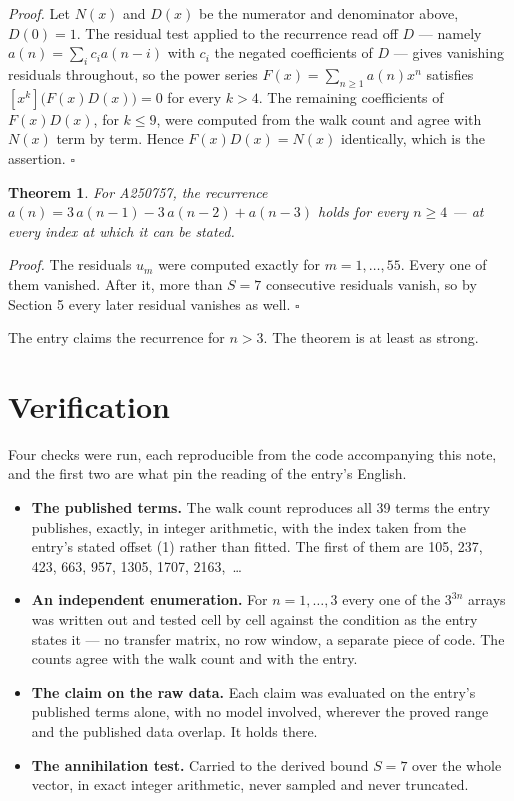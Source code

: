 \documentclass[11pt]{article}
\newtheorem{theorem}{Theorem}
\theoremstyle{definition}
\begin{document}
{\itshape Proof.} Let $N(x)$ and $D(x)$ be the numerator and denominator above, $D(0)=1$. The residual test applied to the recurrence read off $D$ --- namely $a(n) = \sum_i c_i a(n-i)$ with $c_i$ the negated coefficients of $D$ --- gives vanishing residuals throughout, so the power series $F(x)=\sum_{n\ge 1}a(n)x^n$ satisfies $[x^k]\bigl(F(x)D(x)\bigr) = 0$ for every $k > 4$. The remaining coefficients of $F(x)D(x)$, for $k \le 9$, were computed from the walk count and agree with $N(x)$ term by term. Hence $F(x)D(x) = N(x)$ identically, which is the assertion. $\square$

\begin{theorem} For A250757, the recurrence $a(n) = 3\,a(n-1) - 3\,a(n-2) + a(n-3)$ holds for every $n \ge 4$ --- at every index at which it can be stated.\end{theorem}

{\itshape Proof.} The residuals $u_m$ were computed exactly for $m = 1,\dots,55$. Every one of them vanished. After it, more than $S = 7$ consecutive residuals vanish, so by Section 5 every later residual vanishes as well. $\square$

The entry claims the recurrence for $n > 3$. The theorem is at least as strong.

\section{Verification}

Four checks were run, each reproducible from the code accompanying this note, and the first two are what pin the reading of the entry's English.

\begin{itemize}

\item {\bfseries The published terms.} The walk count reproduces all 39 terms the entry publishes, exactly, in integer arithmetic, with the index taken from the entry's stated offset (1) rather than fitted. The first of them are 105, 237, 423, 663, 957, 1305, 1707, 2163,~\dots

\item {\bfseries An independent enumeration.} For $n = 1,\dots,3$ every one of the $3^{3n}$ arrays was written out and tested cell by cell against the condition as the entry states it --- no transfer matrix, no row window, a separate piece of code. The counts agree with the walk count and with the entry.

\item {\bfseries The claim on the raw data.} Each claim was evaluated on the entry's published terms alone, with no model involved, wherever the proved range and the published data overlap. It holds there.

\item {\bfseries The annihilation test.} Carried to the derived bound $S = 7$ over the whole vector, in exact integer arithmetic, never sampled and never truncated.

\end{itemize}
\end{document}
